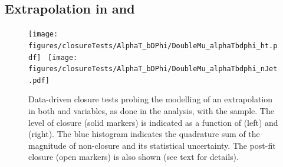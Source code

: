 
\clearpage
\subsection{Extrapolation in \texorpdfstring{\alphat}{AlphaT} and
  \texorpdfstring{\bdphi}{biased dPhi}}

\begin{figure}[h!]
  \begin{center}
    \texttt{[image: figures/closureTests/AlphaT\_bDPhi/DoubleMu\_alphaTbdphi\_ht.pdf]}~
    \texttt{[image: figures/closureTests/AlphaT\_bDPhi/DoubleMu\_alphaTbdphi\_nJet.pdf]}\\
    \caption{Data-driven closure tests probing the modelling of an
      extrapolation in both \alphat and \bdphi variables, as done in
      the analysis, with the \mmj sample. The level of closure (solid
      markers) is indicated as a function of \scalht (left) and \njet
      (right). The blue histogram indicates the quadrature sum of the
      magnitude of non-closure and its statistical uncertainty. The
      post-fit closure (open markers) is also shown (see text for
      details).  }
    \label{fig:closure_AlphaT_bDPhi_mumu}
  \end{center} 
\end{figure}


